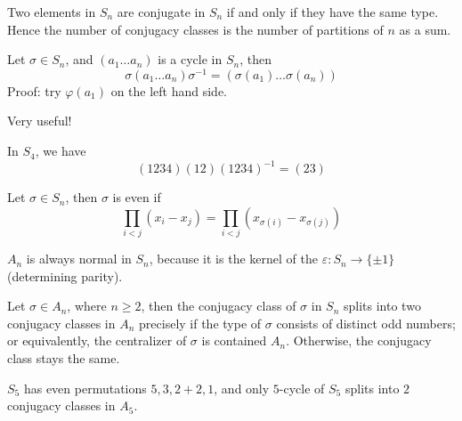 \documentclass[openany]{book}
\begin{document}
\begin{prop}
    Two elements in $S_n$ are conjugate in $S_n$ if and only if they have the same type. Hence the number of conjugacy classes is the number of partitions of $n$ as a sum.
\end{prop}

\begin{prop}
    Let $\sigma\in S_n$, and $(a_1\dots a_n)$ is a cycle in $S_n$, then 
    \begin{equation*}
        \sigma(a_1\dots a_n)\sigma^{-1}=(\sigma(a_1)\dots\sigma(a_n))
    \end{equation*}
    Proof: try $\varphi(a_1)$ on the left hand side.
\end{prop}

\begin{warn}
    Very useful!
\end{warn}
\begin{example}
    In $S_4$, we have 
    \begin{equation*}
        (1234)(12)(1234)^{-1}=(23)
    \end{equation*}
\end{example}



\begin{defn}
    Let $\sigma\in S_n$, then $\sigma$ is even if 
    \begin{equation*}
        \prod_{i<j}(x_i-x_j)=\prod_{i<j}(x_{\sigma(i)}-x_{\sigma(j)})
    \end{equation*}
\end{defn}

\begin{prop}
    $A_n$ is always normal in $S_n$, because it is the kernel of the $\varepsilon: S_n\to\{\pm 1\}$ (determining parity).
\end{prop}


\begin{prop}
    Let $\sigma\in A_n$, where $n\geq 2$, then the conjugacy class of $\sigma$ in $S_n$ splits into two conjugacy classes in $A_n$ precisely if the type of $\sigma$ consists of distinct odd numbers; or equivalently, the centralizer of $\sigma$ is contained $A_n$. Otherwise, the conjugacy class stays the same.
\end{prop}
\begin{example}
    $S_5$ has even permutations $5, 3, 2+2, 1$, and only $5$-cycle of $S_5$ splits into $2$ conjugacy classes in $A_5$.
\end{example}
\end{document}
